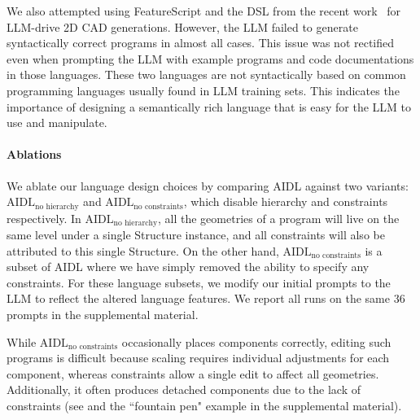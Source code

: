 We also attempted using FeatureScript and the DSL from the recent work~\cite{cascaval2023lineage} for LLM-drive 2D CAD generations. However, the LLM failed to generate syntactically correct programs in almost all cases. This issue was not rectified even when prompting the LLM with example programs and code documentations in those languages. These two languages are not syntactically based on common programming languages usually found in LLM training sets. This indicates the importance of designing a semantically rich language that is easy for the LLM to use and manipulate. 

\paragraph{Ablations}We ablate our language design choices by comparing AIDL  against two variants: $\text{AIDL}_{\text{no hierarchy}}$ and $\text{AIDL}_{\text{no constraints}}$, which disable hierarchy and constraints respectively. In $\text{AIDL}_{\text{no hierarchy}}$, all the geometries of a program will live on the same level under a single Structure instance, and all constraints will also be attributed to this single Structure. On the other hand, $\text{AIDL}_{\text{no constraints}}$ is a subset of AIDL where we have simply removed the ability to specify any constraints. For these language subsets, we modify our initial prompts to the LLM to reflect the altered language features. We report all runs on the same 36 prompts in the supplemental material.

While $\text{AIDL}_{\text{no constraints}}$ occasionally places components correctly, editing such programs is difficult because scaling requires individual adjustments for each component, whereas constraints allow a single edit to affect all geometries. Additionally, it often produces detached components due to the lack of constraints (see  and the ``fountain pen" example in the supplemental material).


